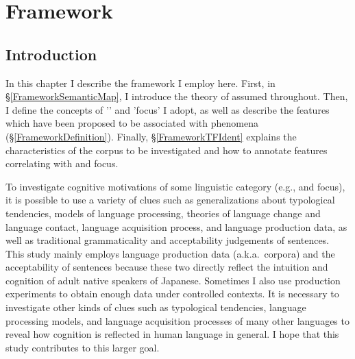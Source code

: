 \chapter{Framework}\label{Framework}


\section{Introduction}\label{FrameworkIntro}

In this chapter I describe the framework I employ here.
First, in \S \ref{FrameworkSemanticMap},
I introduce the theory of  assumed throughout.
Then, I define the concepts of '' and 'focus' I adopt, as well as describe the features
which have been proposed to be associated with  phenomena (\S \ref{FrameworkDefinition}).
Finally,
\S \ref{FrameworkTFIdent} explains the characteristics of the corpus to be investigated and how to annotate features correlating with  and focus.

To investigate cognitive motivations of some linguistic category (e.g.,  and focus),
it is possible to use a variety of clues such as generalizations about typological tendencies, models of language processing, theories of language change and language contact, language acquisition process, and language production data, as well as traditional grammaticality and acceptability judgements of sentences.
This study mainly employs language production data (a.k.a.\ corpora) and
the acceptability of sentences
because these two directly reflect the intuition and cognition of adult native speakers of Japanese.
Sometimes I also use production experiments to obtain enough data
under controlled contexts.
It is necessary to investigate other kinds of clues such as typological tendencies, language processing models, and language acquisition processes of many other languages
to reveal how cognition is reflected in human language in general.
I hope that this study contributes to this larger goal.

